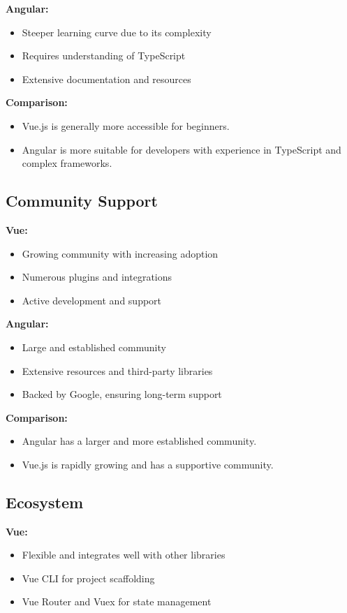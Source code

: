 \textbf{Angular:}
\begin{itemize}
    \item Steeper learning curve due to its complexity
    \item Requires understanding of TypeScript
    \item Extensive documentation and resources
\end{itemize}

\textbf{Comparison:}
\begin{itemize}
    \item Vue.js is generally more accessible for beginners.
    \item Angular is more suitable for developers with experience in TypeScript and complex frameworks.
\end{itemize}

\subsection{Community Support}

\textbf{Vue:}
\begin{itemize}
    \item Growing community with increasing adoption
    \item Numerous plugins and integrations
    \item Active development and support
\end{itemize}

\textbf{Angular:}
\begin{itemize}
    \item Large and established community
    \item Extensive resources and third-party libraries
    \item Backed by Google, ensuring long-term support
\end{itemize}

\textbf{Comparison:}
\begin{itemize}
    \item Angular has a larger and more established community.
    \item Vue.js is rapidly growing and has a supportive community.
\end{itemize}

\subsection{Ecosystem}

\textbf{Vue:}
\begin{itemize}
    \item Flexible and integrates well with other libraries
    \item Vue CLI for project scaffolding
    \item Vue Router and Vuex for state management
\end{itemize}

